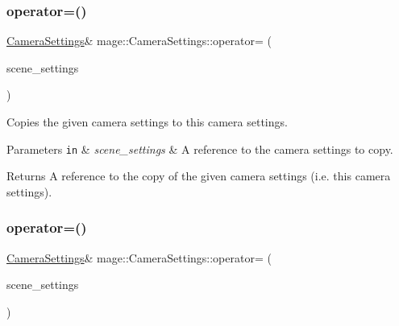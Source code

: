\hypertarget{structmage_1_1_camera_settings_aaabd402e2e9510d0e44ec31320baff87}{}\label{structmage_1_1_camera_settings_aaabd402e2e9510d0e44ec31320baff87} 
\subsubsection{\texorpdfstring{operator=()}{operator=()}\hspace{0.1cm}{\footnotesize\ttfamily [1/2]}}
{\footnotesize\ttfamily \hyperlink{structmage_1_1_camera_settings}{Camera\+Settings}\& mage\+::\+Camera\+Settings\+::operator= (\begin{DoxyParamCaption}\item[{const \hyperlink{structmage_1_1_camera_settings}{Camera\+Settings} \&}]{scene\+\_\+settings }\end{DoxyParamCaption})\hspace{0.3cm}{\ttfamily [default]}}

Copies the given camera settings to this camera settings.


\begin{DoxyParams}[1]{Parameters}
\mbox{\tt in}  & {\em scene\+\_\+settings} & A reference to the camera settings to copy. \\
\hline
\end{DoxyParams}
\begin{DoxyReturn}{Returns}
A reference to the copy of the given camera settings (i.\+e. this camera settings). 
\end{DoxyReturn}
\hypertarget{structmage_1_1_camera_settings_a5104072c8c15e8dfc0b9459a537afe5e}{}\label{structmage_1_1_camera_settings_a5104072c8c15e8dfc0b9459a537afe5e} 
\subsubsection{\texorpdfstring{operator=()}{operator=()}\hspace{0.1cm}{\footnotesize\ttfamily [2/2]}}
{\footnotesize\ttfamily \hyperlink{structmage_1_1_camera_settings}{Camera\+Settings}\& mage\+::\+Camera\+Settings\+::operator= (\begin{DoxyParamCaption}\item[{\hyperlink{structmage_1_1_camera_settings}{Camera\+Settings} \&\&}]{scene\+\_\+settings }\end{DoxyParamCaption})\hspace{0.3cm}{\ttfamily [default]}}

